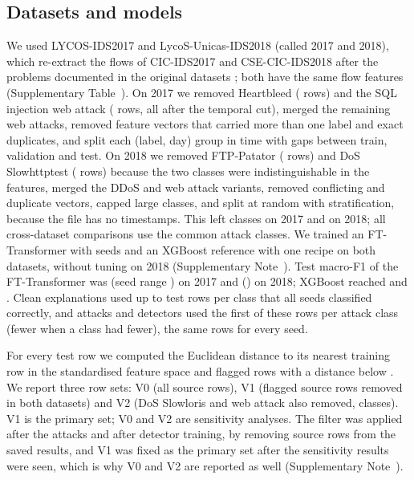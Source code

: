 \subsection*{Datasets and models}
\label{sec:setup}
We used LYCOS-IDS2017 \cite{rosay2021,rosay2022} and LycoS-Unicas-IDS2018 \cite{cantone2024} (called 2017 and 2018),
which re-extract the flows of CIC-IDS2017 and CSE-CIC-IDS2018 \cite{sharafaldin2018,aws_cse_cic_ids2018} after the
problems documented in the original datasets \cite{engelen2021,liu2022,lanvin2022}; both have the same \nFeatures{}
flow features (Supplementary Table~\suppTabData).
On 2017 we removed Heartbleed (\nHeartbleed{} rows) and the SQL injection web attack (\nSqlInjection{} rows, all after
the temporal cut), merged the remaining web attacks, removed feature vectors that carried more than one label and exact
duplicates, and split each (label, day) group in time with gaps between train, validation and test.
On 2018 we removed FTP-Patator (\nFtpRemoved{} rows) and DoS Slowhttptest (\nSlowhttpRemoved{} rows) because the two
classes were indistinguishable in the features, merged the DDoS and web attack variants, removed conflicting and
duplicate vectors, capped large classes, and split at random with stratification, because the file has no timestamps.
This left \nClassesSeventeen{} classes on 2017 and \nClassesEighteen{} on 2018; all cross-dataset comparisons use the
\nCommonClasses{} common attack classes.
We trained an FT-Transformer with \nSeeds{} seeds and an XGBoost reference with one recipe on both datasets, without
tuning on 2018 (Supplementary Note~\suppNoteImpl).
Test macro-F1 of the FT-Transformer was \fOneFTTSeventeen{} (seed range \fOneFTTSeventeenRange) on 2017 and
\fOneFTTEighteen{} (\fOneFTTEighteenRange) on 2018; XGBoost reached \fOneXGBSeventeen{} and \fOneXGBEighteen.
Clean explanations used up to \paramExplPerClass{} test rows per class that all seeds classified correctly, and attacks
and detectors used the first \paramPerClass{} of these rows per attack class (fewer when a class had fewer), the same
rows for every seed.

For every test row we computed the Euclidean distance to its nearest training row in the standardised feature space
and flagged rows with a distance below \paramNDThr.
We report three row sets: V0 (all source rows), V1 (flagged source rows removed in both datasets) and V2 (DoS Slowloris
and web attack also removed, \nVtwoClasses{} classes).
V1 is the primary set; V0 and V2 are sensitivity analyses.
The filter was applied after the attacks and after detector training, by removing source rows from the saved results,
and V1 was fixed as the primary set after the sensitivity results were seen, which is why V0 and V2 are reported as
well (Supplementary Note~\suppNoteNeardup).

